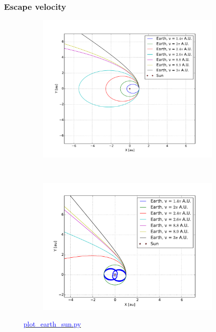 \subsubsection{Escape velocity}


\begin{figure}[H]
    \centering
    \begin{subfigure}{0.5\textwidth}
        \centering
        \includegraphics[width=\linewidth]{result/bilder/escape-velocity.pdf}
    	\caption{}
    \end{subfigure}%
    ~ 
    \begin{subfigure}{0.5\textwidth}
        \centering
        \includegraphics[width=\linewidth]{result/bilder/escape-velocity-r25.pdf}
        \caption{}
    \end{subfigure}
    \caption{\href{https://github.com/erikfsk/Project-3/blob/master/Project3/3a/plot_earth_sun.py}{\textcolor{blue}{plot\_earth\_sun.py}}}
    \label{fig:escape-velocity-low}
\end{figure}



